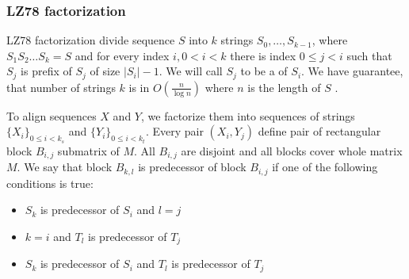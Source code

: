 
\subsubsection{LZ78 factorization}

LZ78 factorization divide sequence $S$ into $k$ strings $S_0,\dots,S_{k-1}$, where
$S_1S_2\dots S_k=S$ and for every index  $i,0< i <k$ there is index $0\leq j<i$
such that $S_j$ is prefix of $S_j$ of size $|S_i|-1$. We will call $S_j$ to be a
 of $S_i$. 
We have guarantee, that number of strings $k$ is in  $O(\frac{n}{\log n})$ where
$n$ is the length of $S$ \cite{}. 

To align sequences $X$ and $Y$, we factorize them into sequences of strings
$\{X_i\}_{0\leq i < k_s}$ and $\{Y_i\}_{0\leq i<k_t}$.  Every pair $(X_i,Y_j)$
define pair of rectangular block $B_{i,j}$ submatrix of $M$.  All $B_{i,j}$ are
disjoint and all blocks cover whole matrix $M$. We say that block $B_{k,l}$ is
predecessor of block $B_{i,j}$ if one of the following conditions is true:


\begin{itemize}
\item $S_k$ is predecessor of $S_i$ and $l=j$
\item $k=i$ and $T_l$ is predecessor of $T_j$
\item $S_k$ is predecessor of $S_i$ and $T_l$ is predecessor of $T_j$
\end{itemize}

